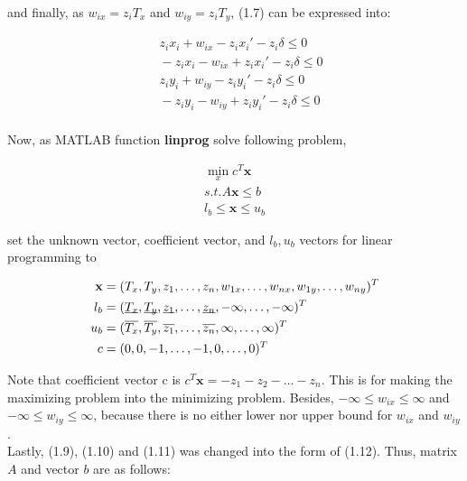 \documentclass[paper=a4, fontsize=11pt]{scrartcl} %
\numberwithin{equation}{section} %
\numberwithin{figure}{section} %
\numberwithin{table}{section} %
\newcommand{\funcname}[1]{\textbf{#1}}
\renewcommand{\vec}[1]{\mathbf{#1}}
\begin{document}
and finally, as $w_{ix} = z_{i}T_{x}$ and $w_{iy} = z_{i}T_{y}$, (1.7) can be expressed into:

\begin{equation}
\begin{split}
\quad z_{i} x_{i} + w_{ix} - z_{i} x_{i}' - z_{i} \delta \leq  0\\
\quad - z_{i} x_{i} - w_{ix} + z_{i} x_{i}' - z_{i} \delta \leq  0\\
\quad z_{i} y_{i} + w_{iy} - z_{i} y_{i}' - z_{i} \delta \leq  0\\
\quad - z_{i} y_{i} - w_{iy} + z_{i} y_{i}' - z_{i} \delta \leq  0\\
\end{split}
\end{equation}

Now, as MATLAB function \funcname{linprog} solve following problem,

\begin{equation}
\begin{split}
\min_{x} c^{T}\vec{x} \\
s.t. A\vec{x} \leq b \\
l_{b} \leq \vec{x} \leq u_{b} 
\end{split}
\end{equation}

set the unknown vector, coefficient vector, and $l_{b}, u_{b}$ vectors for linear programming to

\begin{equation}
\begin{split}
\vec{x} &= (T_{x}, T_{y}, z_{1}, \dots, z_{n}, w_{1x}, \dots, w_{nx}, w_{1y}, \dots, w_{ny})^{T} \\
l_{b} &= (\underbar{$T_{x}$}, \underbar{$T_{y}$}, \underbar{$z_{1}$}, \dots, \underbar{$z_{n}$}, -\infty, \dots, -\infty)^{T} \\
u_{b} &= (\overline{T_{x}}, \overline{T_{y}}, \overline{z_{1}}, \dots, \overline{z_{n}}, \infty, \dots, \infty)^{T} \\
c &= (0, 0, -1, \dots, -1, 0, \dots, 0)^{T}
\end{split}
\end{equation}

Note that coefficient vector c is $c^{T} \vec{x} = - z_{1} - z_{2} - \dots - z_{n}$. This is for making the maximizing problem into the minimizing problem. Besides, $-\infty \leq w_{ix} \leq \infty$ and $-\infty \leq w_{iy} \leq \infty$, because there is no either lower nor upper bound for $w_{ix}$ and $w_{iy}$. \\ Lastly, (1.9), (1.10) and (1.11) was changed into the form of (1.12). Thus, matrix $A$ and vector $b$ are as follows:
\end{document}
